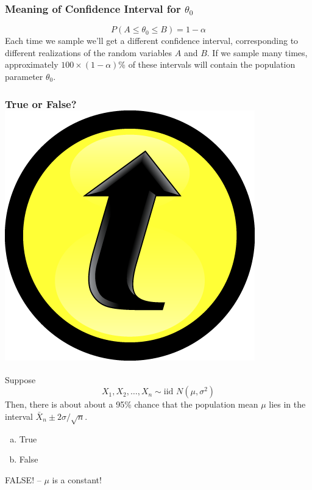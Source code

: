 \documentclass[handout]{beamer}
\begin{document}
\begin{frame}
\frametitle{Meaning of Confidence Interval for $\theta_0$}
	$$\boxed{P(A\leq \theta_0 \leq B) = 1-\alpha}$$
Each time we sample we'll get a different confidence interval, corresponding to different realizations of the random variables $A$ and $B$. If we sample many times, approximately $100\times(1-\alpha)$\% of these intervals will contain the population parameter $\theta_0$.

\end{frame}





\begin{frame}
\frametitle{True or False? \hfill \includegraphics[scale = 0.05]{./images/clicker}}
Suppose 
	$$\boxed{X_1, X_2, \hdots, X_n\sim \mbox{iid } N(\mu,\sigma^2)}$$
Then, there is about about a 95\% chance that the population mean $\mu$ lies in the interval $\bar{X}_n \pm 2 \sigma/\sqrt{n}$.

\vspace{1em}

\begin{enumerate}[(a)]
\item True
\item False
\end{enumerate}


\pause
\vspace{1em}
\alert{\huge FALSE! -- $\mu$  is a constant!}


\end{frame}
\end{document}
